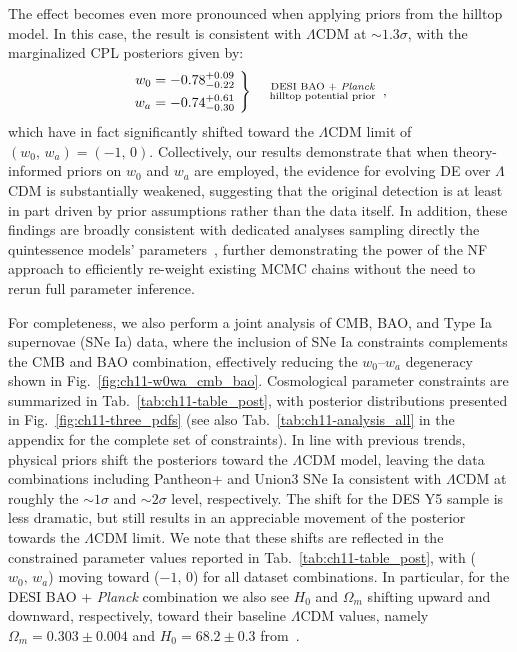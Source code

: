The effect becomes even more pronounced when applying priors from the hilltop model. In this case, the result is consistent with $\Lambda$CDM at $\sim 1.3\sigma$, with the marginalized CPL posteriors given by:
\begin{equation}
\left.
\begin{aligned}
w_0 &=-0.78^{+0.09}_{-0.22}  \\
w_a &= -0.74^{+0.61}_{-0.30}
\end{aligned}
\ \right\}  \quad \substack{\text{ DESI BAO + {\it Planck} } \\ \text{hilltop potential prior}}~,
\end{equation}
which have in fact significantly shifted toward the $\Lambda$CDM limit of $(w_0,\,w_a)=(-1,\,0)$. Collectively, our results demonstrate that when theory-informed priors on $w_0$ and $w_a$ are employed, the evidence for evolving DE over $\Lambda$CDM is substantially weakened, suggesting that the original detection
is at least in part driven by prior assumptions rather than the data itself. In addition, these findings are broadly consistent with dedicated analyses sampling directly the quintessence models' parameters~\cite{Payeur:2024dnq, Wolf:2024eph, Ramadan:2024kmn, Akrami:2025zlb}, further demonstrating the power of the NF approach to efficiently re-weight existing MCMC chains without the need to rerun full parameter inference.



For completeness, we also perform a joint analysis of CMB, BAO, and Type Ia supernovae (SNe Ia) data, where the inclusion of SNe Ia constraints complements the CMB and BAO combination, effectively reducing the $w_0$--$w_a$ degeneracy shown in Fig.~\ref{fig:ch11-w0wa_cmb_bao}. Cosmological parameter constraints are summarized in Tab.~\ref{tab:ch11-table_post}, with posterior distributions presented in Fig.~\ref{fig:ch11-three_pdfs} (see also Tab.~\ref{tab:ch11-analysis_all} in the appendix for the complete set of constraints). In line with previous trends, physical priors shift the posteriors toward the $\Lambda$CDM model, leaving the data combinations including Pantheon+ and Union3 SNe Ia consistent with $\Lambda$CDM at roughly the $\sim 1\sigma$ and $\sim 2\sigma$ level, respectively. The shift for the DES Y5 sample is less dramatic, but still results in an appreciable movement of the posterior towards the $\Lambda$CDM limit. We note that these shifts are reflected in the constrained parameter values reported in Tab.~\ref{tab:ch11-table_post}, with
($w_0,\,w_a$) moving toward ($-1,\,0$) for all dataset combinations. In particular, for the DESI BAO + {\it Planck}  combination we also see $H_0$
and $\Omega_m$ shifting upward and downward, respectively, toward their baseline $\Lambda$CDM values, namely $\Omega_m=0.303 \pm 0.004$ and $H_0=68.2 \pm 0.3$ from~\cite{DESI:2025zgx}.

